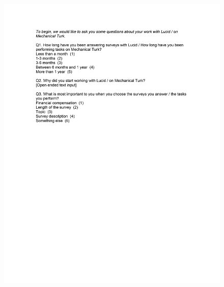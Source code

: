 \documentclass[12pt,econ]{sources/authesis}
\makeatletter
\def\maxwidth{\ifdim\Gin@nat@width>\linewidth\linewidth
\else\Gin@nat@width\fi}
\let\Oldincludegraphics\includegraphics
\renewcommand{\includegraphics}[1]{\Oldincludegraphics[width=\maxwidth]{#1}}
\makeatother
\begin{document}
\begin{figure}[hbt]
  \centering
\includegraphics{data/framing/appendix/questionnaire/questionnaire02.jpg}
\end{figure}
\end{document}
